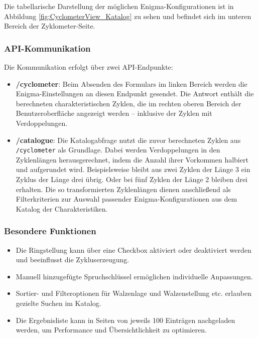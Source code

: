 \documentclass[12pt, ngerman, a4paper, numbers=noenddot]{article}
\begin{document}
Die tabellarische Darstellung der möglichen Enigma-Konfigurationen ist in Abbildung \ref{fig:CyclometerView_Katalog} zu sehen und befindet sich im unteren Bereich der Zyklometer-Seite.



\subsubsection{API-Kommunikation}

Die Kommunikation erfolgt über zwei API-Endpunkte:

\begin{itemize}
	\item \textbf{/cyclometer}: Beim Absenden des Formulars im linken Bereich werden die Enigma-Einstellungen an diesen Endpunkt gesendet. Die Antwort enthält die berechneten charakteristischen Zyklen, die im rechten oberen Bereich der Benutzeroberfläche angezeigt werden – inklusive der Zyklen mit Verdoppelungen.
	\item \textbf{/catalogue}: Die Katalogabfrage nutzt die zuvor berechneten Zyklen aus \newline \lstinline|/cyclometer| als Grundlage. Dabei werden Verdoppelungen in den Zyklenlängen herausgerechnet, indem die Anzahl ihrer Vorkommen halbiert und aufgerundet wird. Beispielsweise bleibt aus zwei Zyklen der Länge 3 ein Zyklus der Länge drei übrig. Oder bei fünf Zyklen der Länge 2 bleiben drei erhalten. Die so transformierten Zyklenlängen dienen anschließend als Filterkriterien zur Auswahl passender Enigma-Konfigurationen aus dem Katalog der Charakteristiken.
\end{itemize}


\subsubsection{Besondere Funktionen}

\begin{itemize}
	\item Die Ringstellung kann über eine Checkbox aktiviert oder deaktiviert werden und beeinflusst die Zykluserzeugung.
	\item Manuell hinzugefügte Spruchschlüssel ermöglichen individuelle Anpassungen.
	\item Sortier- und Filteroptionen für Walzenlage und Walzenstellung etc. erlauben gezielte Suchen im Katalog.
	\item Die Ergebnisliste kann in Seiten von jeweils 100 Einträgen nachgeladen werden, um Performance und Übersichtlichkeit zu optimieren.
\end{itemize}
\end{document}
